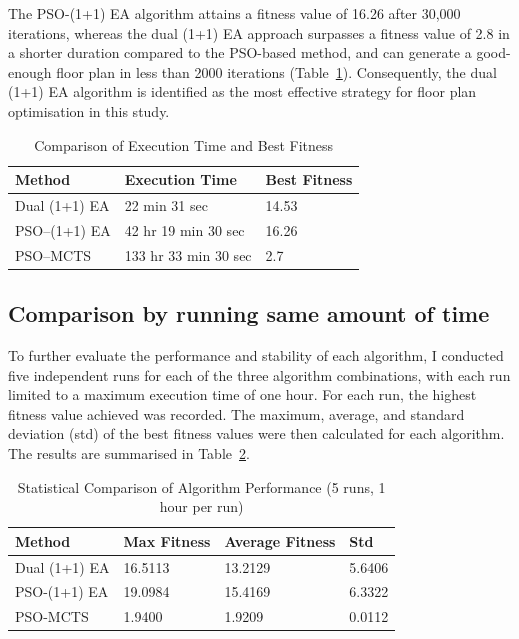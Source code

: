 \documentclass[]{article}
\begin{document}
The PSO-(1+1) EA algorithm attains a fitness value of 16.26 after 30,000 iterations, whereas the dual (1+1) EA approach surpasses a fitness value of 2.8 in a shorter duration compared to the PSO-based method, and can generate a good-enough floor plan in less than 2000 iterations (Table~\ref{tab:algorithm_comparison}). Consequently, the dual (1+1) EA algorithm is identified as the most effective strategy for floor plan optimisation in this study.
\begin{table}[h]
    \centering
    \caption{Comparison of Execution Time and Best Fitness}
    \label{tab:algorithm_comparison}
    \begin{tabularx}{\textwidth}{l | l | l}
        \hline
        \textbf{Method} & \textbf{Execution Time} & \textbf{Best Fitness} \\
        \hline
        Dual (1+1) EA   & 22 min 31 sec           & 14.53                 \\
        PSO--(1+1) EA   & 42 hr 19 min 30 sec     & 16.26                 \\
        PSO--MCTS       & 133 hr 33 min 30 sec    & 2.7                   \\
        \hline
    \end{tabularx}
\end{table}

\subsection{Comparison by running same amount of time}
To further evaluate the performance and stability of each algorithm, I conducted five independent runs for each of the three algorithm combinations, with each run limited to a maximum execution time of one hour. For each run, the highest fitness value achieved was recorded. The maximum, average, and standard deviation (std) of the best fitness values were then calculated for each algorithm. The results are summarised in Table~\ref{tab:statistical_comparison}.

\begin{table}[h]
    \centering
    \caption{Statistical Comparison of Algorithm Performance (5 runs, 1 hour per run)}
    \label{tab:statistical_comparison}
    \begin{tabularx}{\textwidth}{l | l | l | l}
        \hline
        \textbf{Method} & \textbf{Max Fitness} & \textbf{Average Fitness} & \textbf{Std} \\
        \hline
        Dual (1+1) EA   & 16.5113              & 13.2129                  & 5.6406       \\
        PSO-(1+1) EA    & 19.0984              & 15.4169                  & 6.3322       \\
        PSO-MCTS        & 1.9400               & 1.9209                   & 0.0112       \\
        \hline
    \end{tabularx}
\end{table}
\end{document}
